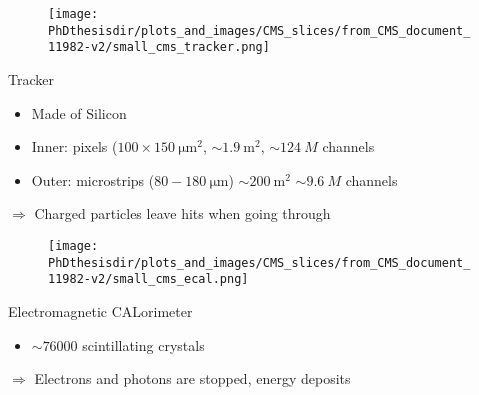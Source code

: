 \begin{frame}
\addtocounter{framenumber}{-1}
\begin{minipage}[t]{.6\textwidth}
\begin{figure}
\texttt{[image: \\PhDthesisdir/plots\_and\_images/CMS\_slices/from\_CMS\_document\_11982-v2/small\_cms\_tracker.png]}
\end{figure}
\end{minipage}
\hfill\begin{minipage}[t]{.35\textwidth}
\begin{block}{Tracker}
\begin{itemize}
\item Made of Silicon
\item Inner: pixels ($\num{100}\times\SI{150}{\micro\meter^2}$, $\sim\SI{1.9}{\meter^2}$, $\sim\SI{124}{M}$ channels
\item Outer: microstrips ($\num{80}-\SI{180}{\micro\meter}$) $\sim\SI{200}{\meter^2}$ $\sim\SI{9.6}{M}$ channels
\end{itemize}
\end{block}

\begin{block}{}
$\Rightarrow$ Charged particles leave hits when going through
\end{block}
\end{minipage}
\end{frame}

\begin{frame}
\addtocounter{framenumber}{-1}
\begin{minipage}[t]{.6\textwidth}
\begin{figure}
\texttt{[image: \\PhDthesisdir/plots\_and\_images/CMS\_slices/from\_CMS\_document\_11982-v2/small\_cms\_ecal.png]}
\end{figure}
\end{minipage}
\hfill\begin{minipage}[t]{.35\textwidth}
\begin{block}{Electromagnetic CALorimeter}
\begin{itemize}
\item $\sim\num{76000}$ scintillating  crystals
\end{itemize}
\end{block}

\begin{block}{}
$\Rightarrow$ Electrons and photons are stopped, energy deposits
\end{block}
\end{minipage}
\end{frame}

